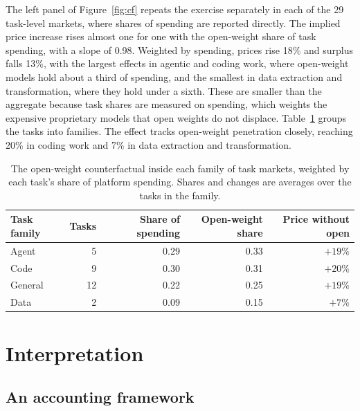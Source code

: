 \documentclass{article}
\newcommand{\TaskCFprice}{18}
\newcommand{\TaskCFcs}{13}
\newcommand{\Ntasks}{29}
\begin{document}
The left panel of Figure~\ref{fig:cf} repeats the exercise separately in each of the
\Ntasks{} task-level markets, where shares of spending are reported directly. The implied
price increase rises almost one for one with the open-weight share of task spending, with a
slope of 0.98. Weighted by spending, prices rise \TaskCFprice\% and surplus falls
\TaskCFcs\%, with the largest effects in agentic and coding work, where open-weight models
hold about a third of spending, and the smallest in data extraction and transformation, where
they hold under a sixth. These are smaller than the aggregate because task shares are
measured on spending, which weights the expensive proprietary models that open weights do not
displace. Table~\ref{tab:tasks} groups the tasks into families. The effect tracks
open-weight penetration closely, reaching 20\% in coding work and 7\% in data
extraction and transformation.

\begin{table}[H]
\caption{The open-weight counterfactual inside each family of task markets, weighted by each
task's share of platform spending. Shares and changes are averages over the tasks in the
family.}
\label{tab:tasks}
\centering
\small
\begin{tabular}{lrrrr}
\toprule
Task family & Tasks & Share of spending & Open-weight share & Price without open \\
\midrule
Agent   & 5  & 0.29 & 0.33 & $+19\%$ \\
Code    & 9  & 0.30 & 0.31 & $+20\%$ \\
General & 12 & 0.22 & 0.25 & $+19\%$ \\
Data    & 2  & 0.09 & 0.15 & $+7\%$ \\
\bottomrule
\end{tabular}
\end{table}

\section{Interpretation}

\subsection{An accounting framework}
\end{document}
